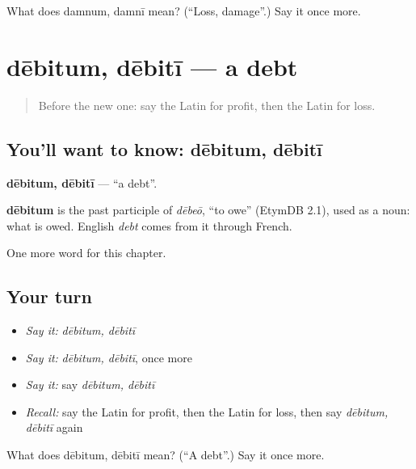 \begin{tcolorbox}[breakable,colback=teal!4,colframe=teal!35!black,title={Before you move on}]
What does damnum, damnī mean? (\textquotedblleft{}Loss, damage\textquotedblright{}.) Say it once more.
\end{tcolorbox}
\section[dēbitum, dēbitī]{dēbitum, dēbitī — a debt}

\label{lesson:LA-C274-debitum}



\begin{quote}
Before the new one: say the Latin for profit, then the Latin for loss.
\end{quote}

\subsection*{You'll want to know: dēbitum, dēbitī}
\textbf{dēbitum, dēbitī} — \textquotedblleft{}a debt\textquotedblright{}.

\begin{cousinweb}
\textbf{dēbitum} is the past participle of \emph{dēbeō}, \textquotedblleft{}to owe\textquotedblright{} (EtymDB 2.1), used as a noun: what is owed. English \emph{debt} comes from it through French.
\end{cousinweb}

\begin{grammarlens}[title={What you've built}]
One more word for this chapter.
\end{grammarlens}

\subsection*{Your turn}
\begin{itemize}
\raggedright
  \item \emph{Say it:} \emph{dēbitum, dēbitī}
  \item \emph{Say it:} \emph{dēbitum, dēbitī}, once more
  \item \emph{Say it:} say \emph{dēbitum, dēbitī}
  \item \emph{Recall:} say the Latin for profit, then the Latin for loss, then say \emph{dēbitum, dēbitī} again
\end{itemize}

\begin{tcolorbox}[breakable,colback=teal!4,colframe=teal!35!black,title={Before you move on}]
What does dēbitum, dēbitī mean? (\textquotedblleft{}A debt\textquotedblright{}.) Say it once more.
\end{tcolorbox}
